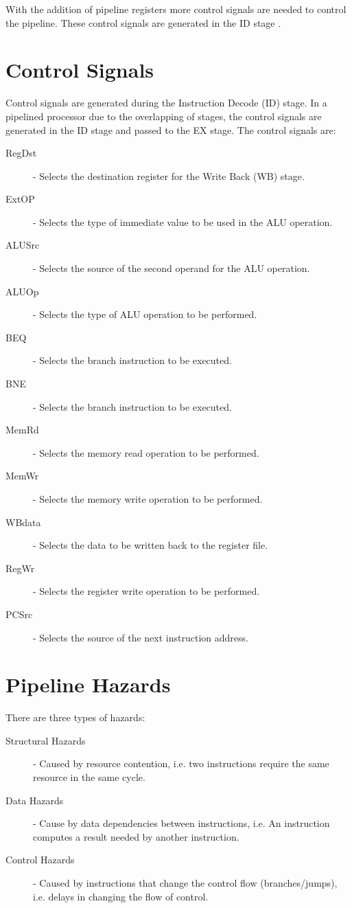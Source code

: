 \documentclass[12pt letter]{report}
\begin{document}
With the addition of pipeline registers more control signals are needed to control the pipeline. These control signals are generated in the ID stage .

\section{Control Signals}
Control signals are generated during the Instruction Decode (ID) stage. In a pipelined processor
due to the overlapping of stages, the control signals are generated in the ID stage and passed to the EX stage. The control signals are:
\begin{description}
  \item[RegDst] - Selects the destination register for the Write Back (WB) stage.
  \item[ExtOP] - Selects the type of immediate value to be used in the ALU operation.
  \item[ALUSrc] - Selects the source of the second operand for the ALU operation.
  \item[ALUOp] - Selects the type of ALU operation to be performed.
  \item[BEQ] - Selects the branch instruction to be executed.
  \item[BNE] - Selects the branch instruction to be executed.
  \item[MemRd] - Selects the memory read operation to be performed.
  \item[MemWr] - Selects the memory write operation to be performed.
  \item[WBdata] - Selects the data to be written back to the register file.
  \item[RegWr] - Selects the register write operation to be performed.
  \item[PCSrc] - Selects the source of the next instruction address.
\end{description}

\section{Pipeline Hazards}


There are three types of hazards:
\begin{description}
  \item[Structural Hazards] - Caused by resource contention, i.e. two instructions require the same resource in the same cycle.
  \item[Data Hazards] - Cause by data dependencies between instructions, i.e. An instruction computes a result needed by another instruction.
  \item[Control Hazards] - Caused by instructions that change the control flow (branches/jumps), i.e. delays in changing the flow of control.
\end{description}
\end{document}
